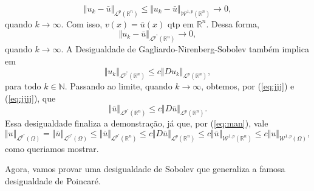\documentclass[a4paper, 11pt]{book}
\theoremstyle{definition}
\newcommand{\bN}{\mathbb{N}}
\newcommand{\bR}{\mathbb{R}}
\newcommand{\cL}{\mathcal{L}}
\newcommand{\cW}{\mathcal{W}}
\begin{document}
\begin{prf}
    \begin{equation} \label{eq:jjjj}
        \Vert u_k - \bar u \Vert_{\cL^p(\bR^n)} \leqslant \Vert u_k - \bar u \Vert_{\cW^{1,p}(\bR^n)} \to 0,
    \end{equation}
    quando $k \to \infty$. Com isso, $v(x) = \bar u(x)$ qtp em $\bR^n$.
    Dessa forma,
    \[
        \Vert u_k - \bar u \Vert_{\cL^{p^*}(\bR^n)} \to 0,
    \]
    quando $k \to \infty$.
    A Desigualdade de Gagliardo-Nirenberg-Sobolev também implica em
    \[  
        \Vert u_k \Vert_{\cL^{p^*}(\bR^n)} \leqslant c \Vert Du_k \Vert_{\cL^p(\bR^n)},
    \]
    para todo $k \in \bN$.
    Passando ao limite, quando $k \to \infty$, obtemos, por (\ref{eq:jjj}) e (\ref{eq:jjjj}), que
    \[
        \Vert \bar u \Vert_{\cL^{p^*}(\bR^n)} \leqslant c \Vert D \bar u \Vert_{\cL^p(\bR^n)}.
    \]
    Essa desigualdade finaliza a demonstração, já que, por (\ref{eq:man}), vale
    \[
        \Vert u \Vert_{\cL^{p^*}(\Omega)} = \Vert \bar u \Vert_{\cL^{p^*}(\Omega)} \leqslant \Vert \bar u \Vert_{\cL^{p^*}(\bR^n)} \leqslant c \Vert D \bar u \Vert_{\cL^p(\bR^n)} \leqslant c \Vert \bar u \Vert_{\cW^{1,p}(\bR^n)} \leqslant c \Vert u \Vert_{\cW^{1,p}(\Omega)},
    \]
    como queriamos mostrar.
\end{prf}

Agora, vamos provar uma desigualdade de Sobolev que generaliza a famosa desigualdade de Poincaré.
\end{document}
